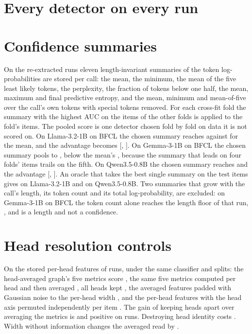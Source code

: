 \section{Every detector on every run}
\label{app:detectors}

\begin{center}\scriptsize

\end{center}

\section{Confidence summaries}
\label{app:confidence}

On the re-extracted runs eleven length-invariant summaries of the token log-probabilities are stored per call: the mean, the minimum, the mean of the five least likely tokens, the perplexity, the fraction of tokens below one half, the mean, maximum and final predictive entropy, and the mean, minimum and mean-of-five over the call's own tokens with special tokens removed. For each cross-fit fold the summary with the highest AUC on the items of the other folds is applied to the fold's items. The pooled score is one detector chosen fold by fold on data it is not scored on. On Llama-3.2-1B on BFCL the chosen summary reaches \aucBestConfLlamaOneBBfcl{} against \aucConfLlamaOneBBfcl{} for the mean, and the advantage becomes \gapBestLlamaOneBBfcl{} [\gapBestLoLlamaOneBBfcl{}, \gapBestHiLlamaOneBBfcl{}]. On Gemma-3-1B on BFCL the chosen summary pools to \aucBestConfGemmaBfcl{}, below the mean's \aucConfGemmaBfcl{}, because the summary that leads on four folds' items trails on the fifth. On Qwen3.5-0.8B the chosen summary reaches \aucBestConfQwenThreeFiveBfcl{} and the advantage \gapBestQwenThreeFiveBfcl{} [\gapBestLoQwenThreeFiveBfcl{}, \gapBestHiQwenThreeFiveBfcl{}]. An oracle that takes the best single summary on the test items gives \aucOracleConfLlamaOneBBfcl{} on Llama-3.2-1B and \aucOracleConfQwenThreeFiveBfcl{} on Qwen3.5-0.8B. Two summaries that grow with the call's length, its token count and its total log-probability, are excluded: on Gemma-3-1B on BFCL the token count alone reaches the length floor of that run, \aucFloorGemmaBfcl{}, and is a length and not a confidence.

\section{Head resolution controls}
\label{app:ladder}

On the stored per-head features of \ladNRuns{} runs, under the same classifier and splits: the head-averaged graph's five metrics score \ladGraphAvg{}, the same five metrics computed per head and then averaged \ladMetricAvg{}, all heads kept \ladPerHead{}, the averaged features padded with Gaussian noise to the per-head width \ladNoisePadded{}, and the per-head features with the head axis permuted independently per item \ladHeadShuffled{}. The gain of keeping heads apart over averaging the metrics is \ladGainPerHead{} and positive on \ladGainPerHeadPos{} runs. Destroying head identity costs \ladGainVsShuffle{}. Width without information changes the averaged read by \ladNoiseEffect{}.

